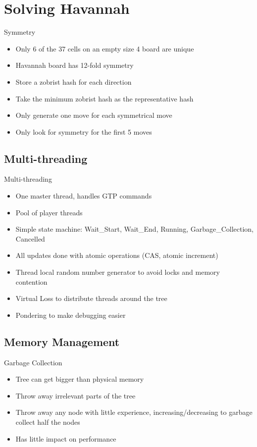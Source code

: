 \documentclass{beamer} %
\begin{document}

\section{Solving Havannah}

\begin{frame}{Symmetry}
\begin{itemize}
\item Only 6 of the 37 cells on an empty size 4 board are unique
\item Havannah board has 12-fold symmetry
\item Store a zobrist hash for each direction
\item Take the minimum zobrist hash as the representative hash
\item Only generate one move for each symmetrical move
\item Only look for symmetry for the first 5 moves
\end{itemize}
\end{frame}

\subsection{Multi-threading}

\begin{frame}{Multi-threading}
\begin{itemize}
\item One master thread, handles GTP commands
\item Pool of player threads
\item Simple state machine: Wait\_Start, Wait\_End, Running, Garbage\_Collection, Cancelled
\item All updates done with atomic operations (CAS, atomic increment)
\item Thread local random number generator to avoid locks and memory contention
\item Virtual Loss to distribute threads around the tree
\item Pondering to make debugging easier
\end{itemize}
\end{frame}

\subsection{Memory Management}

\begin{frame}{Garbage Collection}
\begin{itemize}
\item Tree can get bigger than physical memory
\item Throw away irrelevant parts of the tree
\item Throw away any node with little experience, increasing/decreasing to garbage collect half the nodes
\item Has little impact on performance
\end{itemize}
\end{frame}
\end{document}
